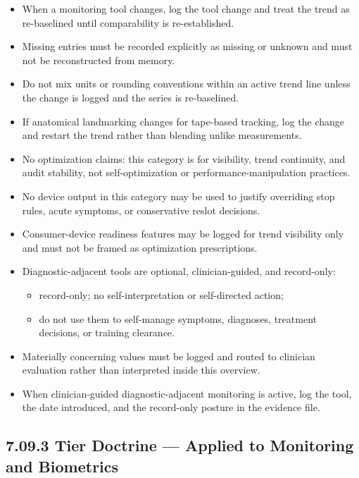 \documentclass[10pt]{article}
\begin{document}
\begin{itemize}
\begin{itemize}
  \item consistent rounding precision and unit conventions across all logged entries;
  \item consistent anatomical landmarks and tape tension for tape-measure sites.
  \end{itemize}
\item When a monitoring tool changes, log the tool change and treat the trend as re-baselined until comparability is re-established.
\item Missing entries must be recorded explicitly as missing or unknown and must not be reconstructed from memory.
\item Do not mix units or rounding conventions within an active trend line unless the change is logged and the series is re-baselined.
\item If anatomical landmarking changes for tape-based tracking, log the change and restart the trend rather than blending unlike measurements.
\item No optimization claims: this category is for visibility, trend continuity, and audit stability, not self-optimization or performance-manipulation practices.
\item No device output in this category may be used to justify overriding stop rules, acute symptoms, or conservative reslot decisions.
\item Consumer-device readiness features may be logged for trend visibility only and must not be framed as optimization prescriptions.
\item Diagnostic-adjacent tools are optional, clinician-guided, and record-only:
  \begin{itemize}
  \item record-only; no self-interpretation or self-directed action;
  \item do not use them to self-manage symptoms, diagnoses, treatment decisions, or training clearance.
  \end{itemize}
\item Materially concerning values must be logged and routed to clinician evaluation rather than interpreted inside this overview.
\item When clinician-guided diagnostic-adjacent monitoring is active, log the tool, the date introduced, and the record-only posture in the evidence file.
\end{itemize}

\subsection*{7.09.3 Tier Doctrine — Applied to Monitoring and Biometrics}
{}
\end{document}
